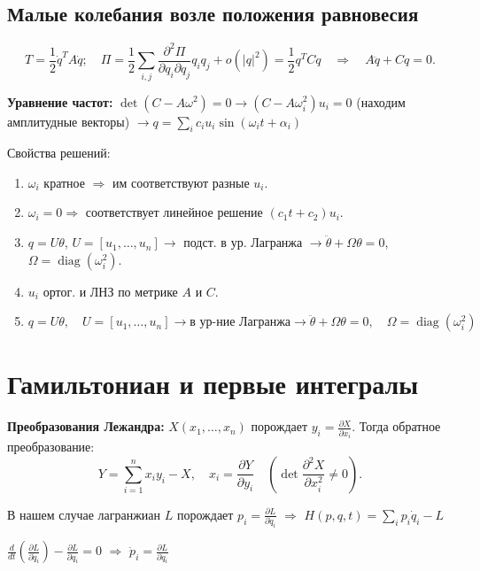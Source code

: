 \documentclass[12pt, a4paper]{article}
\theoremstyle{plain}
\theoremstyle{definition}
\theoremstyle{remark}
\begin{document}
\subsection{Малые колебания возле положения равновесия}

\[
T = \frac{1}{2}\dot{q}^T A \dot{q}; \quad \Pi = \frac{1}{2}\sum_{i,j} \frac{\partial^2 \Pi}{\partial q_i \partial q_j} q_i q_j + o(|q|^2) = \frac{1}{2}q^T C q \quad \Rightarrow \quad A\ddot{q} + Cq = 0.
\]

\textbf{Уравнение частот:} $\det(C - A\omega^2) = 0 \to (C - A\omega_i^2)u_i = 0$ (находим амплитудные векторы) $\to q = \sum_i c_i u_i \sin(\omega_i t + \alpha_i)$

Свойства решений:
\begin{enumerate}
    \item $\omega_i$ кратное $\Rightarrow$ им соответствуют разные $u_i$.
    \item $\omega_i = 0 \Rightarrow$ соответствует линейное решение $(c_1 t + c_2)u_i$.
    \item $q = U\theta$, $U = [u_1, \ldots, u_n] \to$ подст. в ур. Лагранжа $\to \ddot{\theta} + \Omega\theta = 0$, $\Omega = \operatorname{diag}(\omega_i^2)$.
    \item $u_i$ ортог. и ЛНЗ по метрике $A$ и $C$.
    \item $q = U\theta, \quad U = [u_1, \ldots, u_n] \to \text{в ур-ние Лагранжа} \to \ddot{\theta} + \Omega\theta = 0, \quad \Omega = \operatorname{diag}(\omega_i^2)$
\end{enumerate}





\newpage

\section{Гамильтониан и первые интегралы}

\textbf{Преобразования Лежандра:} $X(x_1, \ldots, x_n)$ порождает $y_i = \frac{\partial X}{\partial x_i}$. Тогда обратное преобразование:
\[
Y = \sum_{i=1}^{n} x_i y_i - X, \quad x_i = \frac{\partial Y}{\partial y_i} \quad \left(\det\frac{\partial^2 X}{\partial x_i^2} \neq 0\right).
\]


В нашем случае лагранжиан $L$ порождает $p_i = \frac{\partial L}{\partial \dot{q}_i}$ $\Rightarrow$ $H(p, q, t) = \sum_i p_i \dot{q}_i - L$%

$\frac{d}{dt}\left(\frac{\partial L}{\partial \dot{q}_i}\right) - \frac{\partial L}{\partial q_i} = 0$ $\Rightarrow$ $\dot{p}_i = \frac{\partial L}{\partial q_i}$
\end{document}
